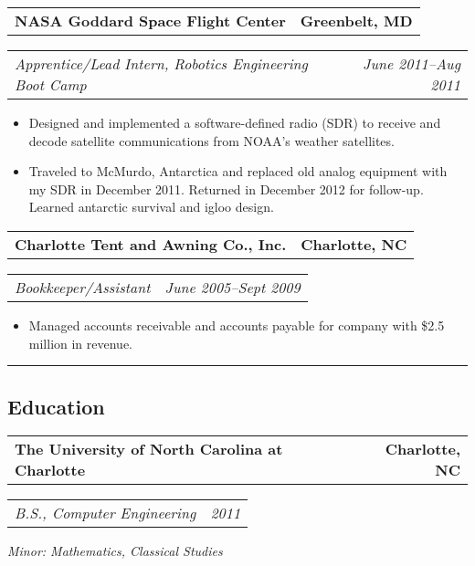 \documentclass[10pt,letterpaper]{article}
\newcommand{\headerrow}[2]{%
    \begin{tabularx}{\linewidth}{Xr}
	    #1 & #2 \\
    \end{tabularx}
}
\begin{document}
	\headerrow{\textbf{NASA Goddard Space Flight Center}}{\textbf{Greenbelt, MD}}
	\headerrow{\textit{Apprentice/Lead Intern, Robotics Engineering Boot Camp}}
		{\textit{June 2011--Aug 2011}}
    \begin{itemize}[label=--]
        \item Designed and implemented a software-defined radio (SDR) to
          receive and decode satellite communications from NOAA's weather satellites.

        \item Traveled to McMurdo, Antarctica and replaced old analog
            equipment with my SDR in December 2011. Returned in December 2012 for follow-up. Learned antarctic
            survival and igloo design.
	\end{itemize}

	\headerrow{\textbf{Charlotte Tent and Awning Co., Inc.}}{\textbf{Charlotte, NC}}
	\headerrow{\textit{Bookkeeper/Assistant}}{\textit{June 2005--Sept 2009}}
    \begin{itemize}[label=--]
        \item Managed accounts receivable and accounts payable for company with \$2.5 million in revenue.
	\end{itemize}

\vspace{2pt}
\hrule
\vspace{-0.8em}
\subsection*{Education}
	\headerrow{\textbf{The University of North Carolina at Charlotte}}
		{\textbf{Charlotte, NC}}
	\headerrow{\textit{B.S., Computer Engineering}}{\textit{2011}}
		\textit{Minor: Mathematics, Classical Studies} \\
\end{document}
